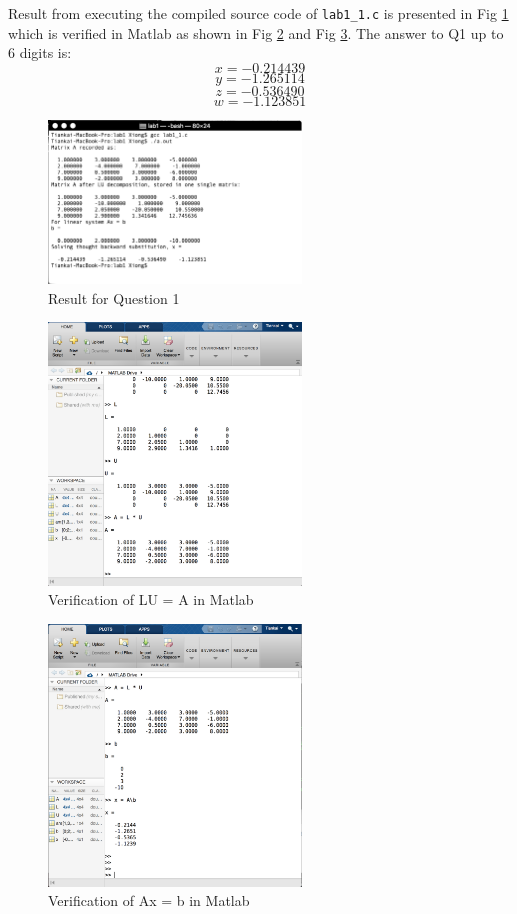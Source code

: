 \documentclass{article}
\begin{document}
Result from executing the compiled source code of
\texttt{lab1\_1.c} is presented in Fig \ref{fig:result1-1} which is
verified in Matlab as shown in Fig \ref{fig:matlab1} and Fig
\ref{fig:matlab2}. The answer to Q1 up to 6 digits is:
$$x = -0.214439$$
$$y = -1.265114$$
$$z = -0.536490$$
$$w = -1.123851$$

\begin{figure}
  \centering
  \includegraphics[width=0.6\textwidth]{result1-1.png}
  \caption{Result for Question 1}
  \label{fig:result1-1}
\end{figure}

\begin{figure}
  \centering
  \includegraphics[width=0.6\textwidth]{matlab1.png}
  \caption{Verification of LU = A in Matlab}
  \label{fig:matlab1}
\end{figure}

\begin{figure}
  \centering
  \includegraphics[width=0.6\textwidth]{matlab2.png}
  \caption{Verification of Ax = b in Matlab}
  \label{fig:matlab2}
\end{figure}
\end{document}
